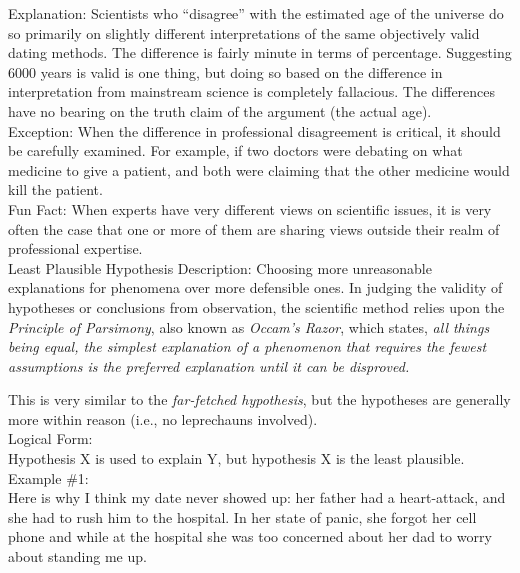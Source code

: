 \documentclass[a4paper,12pt,single,pdftex]{scrartcl}
\begin{document}
    
      Explanation: Scientists who “disagree” with the estimated age of the universe do so primarily on slightly different interpretations of the same objectively valid dating methods.  The difference is fairly minute in terms of percentage.  Suggesting 6000 years is valid is one thing, but doing so based on the difference in interpretation from mainstream science is completely fallacious.  The differences have no bearing on the truth claim of the argument (the actual age).
    \\

    
      Exception: When the difference in professional disagreement is critical, it should be carefully examined. For example, if two doctors were debating on what medicine to give a patient, and both were claiming that the other medicine would kill the patient.
    \\

    
      Fun Fact: When experts have very different views on scientific issues, it is very often the case that one or more of them are sharing views outside their realm of professional expertise.
    \\

  

Least Plausible Hypothesis
    Description: Choosing more unreasonable explanations for phenomena over more defensible ones.  In judging the validity of hypotheses or conclusions from observation, the scientific method relies upon the {\it Principle of Parsimony}, also known as {\it Occam’s Razor}, which states, {\it all things being equal, the simplest explanation of a phenomenon that requires the fewest assumptions is the preferred explanation until it can be disproved.  }

    
      This is very similar to the {\it far-fetched hypothesis}, but the hypotheses are generally more within reason (i.e., no leprechauns involved).
    \\

    
      Logical Form:
    \\

    
      Hypothesis X is used to explain Y, but hypothesis X is the least plausible.
    \\

    
      Example \#1:
    \\

    
      Here is why I think my date never showed up: her father had a heart-attack, and she had to rush him to the hospital.  In her state of panic, she forgot her cell phone and while at the hospital she was too concerned about her dad to worry about standing me up.
    \\
\end{document}
